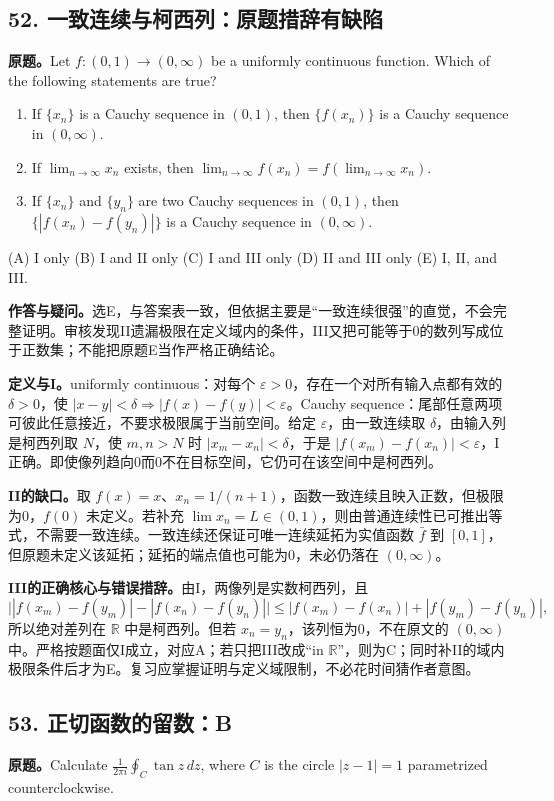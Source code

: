 \documentclass[11pt,a4paper,fontset=fandol]{ctexart}
\begin{document}
\subsection{52. 一致连续与柯西列：原题措辞有缺陷}
\label{ms:q52}
\textbf{原题。}Let $f:(0,1)\to(0,\infty)$ be a uniformly continuous function. Which of the following statements are true?
\begin{enumerate}[label=\Roman*.]
\item If $\{x_n\}$ is a Cauchy sequence in $(0,1)$, then $\{f(x_n)\}$ is a Cauchy sequence in $(0,\infty)$.
\item If $\lim_{n\to\infty}x_n$ exists, then $\lim_{n\to\infty}f(x_n)=f(\lim_{n\to\infty}x_n)$.
\item If $\{x_n\}$ and $\{y_n\}$ are two Cauchy sequences in $(0,1)$, then $\{|f(x_n)-f(y_n)|\}$ is a Cauchy sequence in $(0,\infty)$.
\end{enumerate}
(A) I only \quad (B) I and II only \quad (C) I and III only \quad (D) II and III only \quad (E) I, II, and III.

\textbf{作答与疑问。}选E，与答案表一致，但依据主要是“一致连续很强”的直觉，不会完整证明。审核发现II遗漏极限在定义域内的条件，III又把可能等于0的数列写成位于正数集；不能把原题E当作严格正确结论。

\textbf{定义与I。}uniformly continuous：对每个 $\varepsilon>0$，存在一个对所有输入点都有效的 $\delta>0$，使 $|x-y|<\delta\Rightarrow|f(x)-f(y)|<\varepsilon$。Cauchy sequence：尾部任意两项可彼此任意接近，不要求极限属于当前空间。给定 $\varepsilon$，由一致连续取 $\delta$，由输入列是柯西列取 $N$，使 $m,n>N$ 时 $|x_m-x_n|<\delta$，于是 $|f(x_m)-f(x_n)|<\varepsilon$，I正确。即使像列趋向0而0不在目标空间，它仍可在该空间中是柯西列。

\textbf{II的缺口。}取 $f(x)=x$、$x_n=1/(n+1)$，函数一致连续且映入正数，但极限为0，$f(0)$ 未定义。若补充 $\lim x_n=L\in(0,1)$，则由普通连续性已可推出等式，不需要一致连续。一致连续还保证可唯一连续延拓为实值函数 $\bar f$ 到 $[0,1]$，但原题未定义该延拓；延拓的端点值也可能为0，未必仍落在 $(0,\infty)$。

\textbf{III的正确核心与错误措辞。}由I，两像列是实数柯西列，且
\[
\big||f(x_m)-f(y_m)|-|f(x_n)-f(y_n)|\big|
\le |f(x_m)-f(x_n)|+|f(y_m)-f(y_n)|,
\]
所以绝对差列在 $\mathbb R$ 中是柯西列。但若 $x_n=y_n$，该列恒为0，不在原文的 $(0,\infty)$ 中。严格按题面仅I成立，对应A；若只把III改成“in $\mathbb R$”，则为C；同时补II的域内极限条件后才为E。复习应掌握证明与定义域限制，不必花时间猜作者意图。

\subsection{53. 正切函数的留数：B}
\label{ms:q53}
\textbf{原题。}Calculate $\displaystyle\frac1{2\pi i}\oint_C\tan z\,dz$, where $C$ is the circle $|z-1|=1$ parametrized counterclockwise.
\end{document}
